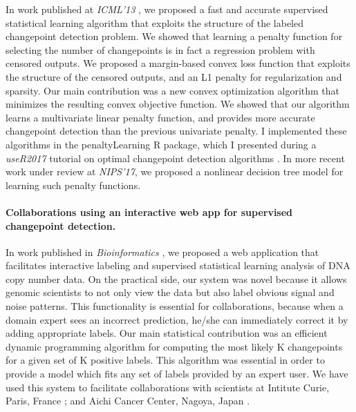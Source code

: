 \documentclass{article}
\begin{document}
In work published at \emph{ICML'13} \citep{HOCKING-penalties}, we
proposed a fast and accurate supervised statistical learning algorithm
that exploits the structure of the labeled changepoint detection
problem. We showed that learning a penalty function for selecting the
number of changepoints is in fact a regression problem with censored
outputs. 
We proposed a margin-based convex loss function that exploits the
structure of the censored outputs, and an L1 penalty for
regularization and sparsity. Our main contribution was a new convex
optimization algorithm that minimizes the resulting convex objective
function. We showed that our algorithm learns a multivariate linear
penalty function, and provides more accurate changepoint detection
than the previous univariate penalty. I implemented these algorithms
in the penaltyLearning R package, which I presented during a
\emph{useR2017} tutorial on optimal changepoint detection algorithms
\citep{change-tutorial}. In more recent work under review at
\emph{NIPS'17}, we proposed a nonlinear decision tree model for
learning such penalty functions.

\paragraph{Collaborations using an interactive web app for supervised
  changepoint detection.} In work published in \emph{Bioinformatics}
\citep{hocking-SegAnnDB}, we proposed a web application that
facilitates interactive labeling and supervised statistical learning
analysis of DNA copy number data. On the practical side, our system
was novel because it allows genomic scientists to not only view the
data but also label obvious signal and noise patterns. This
functionality is essential for collaborations, because when a domain
expert sees an incorrect prediction, he/she can
immediately correct it by adding appropriate labels. Our main
statistical contribution was an efficient dynamic programming
algorithm for computing the most likely K changepoints for a given set
of K positive labels. This algorithm was essential in order to provide a model
which fits any set of labels provided by an expert user. We have used
this system to facilitate collaborations with scientists at Intitute
Curie, Paris, France \citep{Chicard}; and Aichi Cancer Center, Nagoya,
Japan \citep{Hocking-Leukemia-2016,m14:clonal}.
\end{document}
